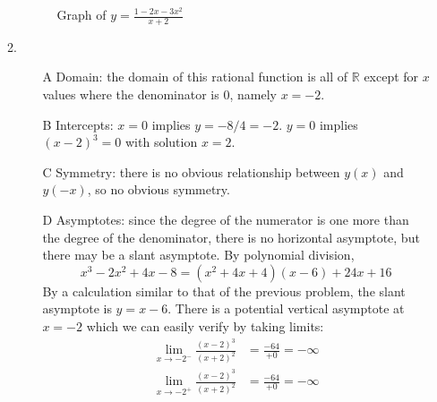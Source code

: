 \documentclass{article}
\newcommand{\ds}{\displaystyle}
\begin{document}
\begin{enumerate}
\begin{enumerate}
\begin{figure}[htbp]
      \caption{Graph of $\ds y=\frac{1-2x-3x^2}{x+2}$}
      \label{fig:1-2x-3x2overx+2}
    \end{figure}
  \item %
    \begin{itemize}
    \item[A] Domain: the domain of this rational function is all of
      $\mathbb{R}$ except for $x$ values where the denominator is $0$,
      namely $x=-2$.
    \item[B] Intercepts: $x=0$ implies $y=-8/4=-2$.  $y=0$ implies
      $(x-2)^3=0$ with solution $x=2$.
    \item[C] Symmetry: there is no obvious relationship between $y(x)$
      and $y(-x)$, so no obvious symmetry.
    \item[D] Asymptotes: since the degree of the numerator is one more
      than the degree of the denominator, there is no horizontal
      asymptote, but there may be a slant asymptote.  By polynomial
      division,
      \begin{displaymath}
        x^3-2x^2+4x-8 = (x^2+4x+4)(x-6) + 24x+16
      \end{displaymath}
      By a calculation similar to that of the previous problem, the
      slant asymptote is $y=x-6$.  There is a potential vertical
      asymptote at $x=-2$ which we can easily verify by taking limits:
      \begin{align*}
        \lim_{x\to -2^-} \frac{(x-2)^3}{(x+2)^2} &= \frac{-64}{+0} = -\infty
        \\
        \lim_{x\to -2^+} \frac{(x-2)^3}{(x+2)^2} &= \frac{-64}{+0} = -\infty
      \end{align*}

\end{itemize}
\end{enumerate}
\end{enumerate}
\end{document}

